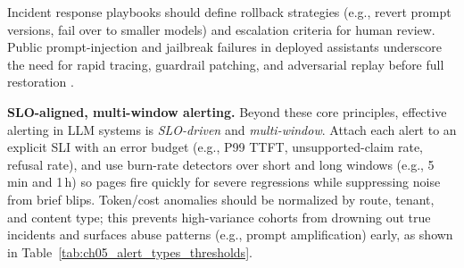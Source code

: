 Incident response playbooks should define rollback strategies (e.g., revert prompt versions, fail over to smaller models) and escalation criteria for human review. Public prompt-injection and jailbreak failures in deployed assistants underscore the need for rapid tracing, guardrail patching, and adversarial replay before full restoration \cite{owasp_llm}.

\medskip
\noindent\textbf{SLO-aligned, multi-window alerting.}
Beyond these core principles, effective alerting in LLM systems is \emph{SLO-driven} and \emph{multi-window}. Attach each alert to an explicit SLI with an error budget (e.g., P99 TTFT, unsupported-claim rate, refusal rate), and use burn-rate detectors over short and long windows (e.g., 5\,min and 1\,h) so pages fire quickly for severe regressions while suppressing noise from brief blips. Token/cost anomalies should be normalized by route, tenant, and content type; this prevents high-variance cohorts from drowning out true incidents and surfaces abuse patterns (e.g., prompt amplification) early, as shown in Table~\ref{tab:ch05_alert_types_thresholds}.


